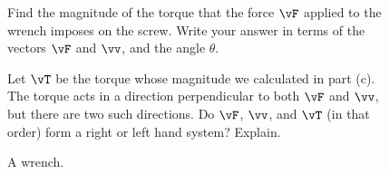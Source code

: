 \begin{pa}
\begin{figure}[ht]
\begin{minipage}{4in}
\begin{comment}

The force applied perpendicular to the handle is the length of the dashed segment in Figure \ref{F:Wrench}. Using trigonometry we see that this magnitude is simply
\[|\vf| \sin(theta).\]

\end{comment}

    \item Find the magnitude of the torque that the force $\vF$ applied to the wrench imposes on the screw. Write your answer in terms of the vectors $\vF$ and $\vv$, and the angle $\theta$.

\begin{comment}

Since the magnitude of the torque is the product of the magnitude of the force applied perpendicular to the handle and the length of the handle, we have that the magnitude of the torque is
\[|\vF| \sin(theta) |\vv|.\]

\end{comment}

    \item Let $\vT$ be the torque whose magnitude we calculated in part (c). The torque acts in a direction perpendicular to both $\vF$ and $\vv$, but there are two such directions. Do $\vF$, $\vv$, and $\vT$ (in that order) form a right or left hand system? Explain.

\begin{comment}

When I point the index finger of my right hand in the direction of the vector $\vF$ and my middle finger in the direction of $\vv$, my thumb points in the direction of the vector $\vT$. So $\vF$, $\vv$, and $\vT$ (in that order) form a right hand system.

\end{comment}

    \ea
\end{minipage} \hspace{0.2in}
\begin{minipage}{1.5in}
\begin{center}
\end{center}
\caption{A wrench.}
\label{F:9.4.Wrench}
\end{minipage}
\end{figure}


\end{pa} \afterpa 